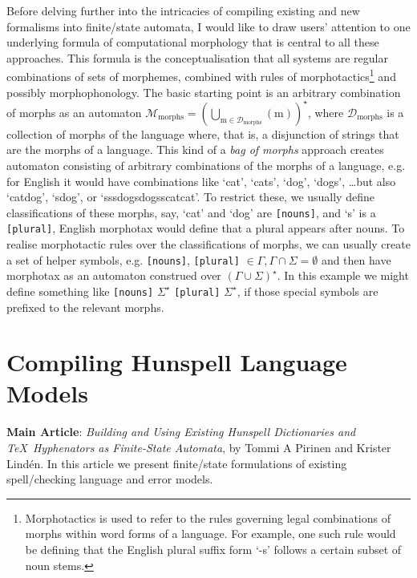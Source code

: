 \documentclass[officiallayout,final]{unihelcompling}
\begin{document}
Before delving further into the intricacies of compiling existing and new
\glspl{formalism} into finite\-/state automata, I would like to draw users'
attention to one underlying formula of computational morphology that is central
to all these approaches. This formula is the conceptualisation that all systems
are regular combinations of sets of morphemes, combined with rules of
\gls{morphotactics}\footnote{Morphotactics is used to refer to the rules
    governing legal combinations of morphs within word forms of a language. For
example, one such rule would be defining that the English plural suffix form
`-s' follows a certain subset of noun stems.} and possibly morphophonology.
The basic starting point is an arbitrary combination of morphs as an automaton
$\mathcal{M}_{\mathrm{morphs}} = (\bigcup_{\mathrm{m \in
{\mathcal{D}_\mathrm{morphs}}}} ({\mathrm{m}}))^\star$, where
$\mathcal{D}_\mathrm{morphs}$ is a collection of morphs of the language where,
that is, a disjunction of strings that are the morphs of a language.  This kind
of a \emph{bag of morphs} approach creates automaton consisting of arbitrary
combinations of the morphs of a language, e.g. for English it would have
combinations like `cat', `cats', `dog', `dogs', \ldots but also `catdog',
`sdog', or `sssdogsdogsscatcat'. To restrict these, we usually define
classifications of these morphs, say, `cat' and `dog' are \texttt{[nouns]}, and
`s' is a \texttt{[plural]}, English morphotax would define that a plural
appears after nouns. To realise morphotactic rules over the classifications of
morphs, we can usually create a set of helper symbols, e.g.  {\texttt{[nouns]},
\texttt{[plural]}} $\in \Gamma, \Gamma \cap \Sigma = \emptyset$ and then have
morphotax as an automaton construed over $(\Gamma \cup \Sigma)^\star$. In this
example we might define something like \texttt{[nouns]} $\Sigma^\star$
\texttt{[plural]} $\Sigma^\star$, if those special symbols are prefixed to the
relevant morphs.

\section{Compiling Hunspell Language Models}
\label{sec:Hunspell}

\textbf{Main Article}: \emph{Building and Using Existing Hunspell Dictionaries
and \TeX\ Hyphenators as Finite-State Automata}, by Tommi A Pirinen and Krister
Lindén.  In this article we present finite\-/state formulations of existing
spell\-/checking language and error models.
\end{document}
